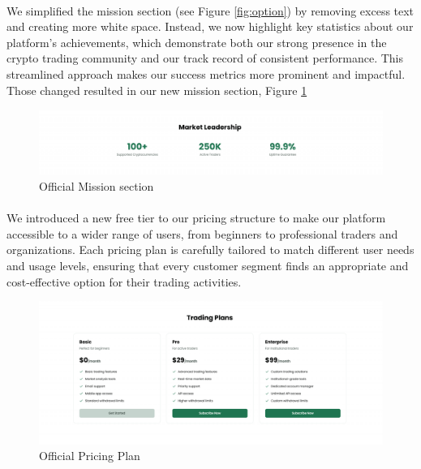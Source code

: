 \paragraph{}We simplified the mission section (see Figure \ref{fig:option}) by removing excess text and creating more white space. Instead, we now highlight key statistics about our platform's achievements, which demonstrate both our strong presence in the crypto trading community and our track record of consistent performance. This streamlined approach makes our success metrics more prominent and impactful. Those changed resulted in our new mission section, Figure \ref{fig:option_2.0}
  \begin{figure}[h]
    \centering
    \includegraphics[width= 1\textwidth]{root/op1.png}
     \caption{Official Mission section}
    \label{fig:option_2.0}
\end{figure}
\paragraph{}We introduced a new free tier to our pricing structure to make our platform accessible to a wider range of users, from beginners to professional traders and organizations. Each pricing plan is carefully tailored to match different user needs and usage levels, ensuring that every customer segment finds an appropriate and cost-effective option for their trading activities.
  \begin{figure}[h]
    \centering
    \includegraphics[width= 1\textwidth]{root/op2.png}
     \caption{Official Pricing Plan}
    \label{fig:option_2_2.0}
\end{figure}
